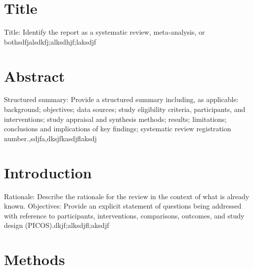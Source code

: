 \documentclass{article}\usepackage[]{graphicx}\usepackage[]{color}
\begin{document}
\section{Title}


Title: Identify the report as a systematic review, meta-analysis, or bothsdfjalsdkfj;alksdhjf;laksdjf

\section{Abstract}

Structured summary: Provide a structured summary including, as applicable: background; objectives; data sources; study eligibility criteria, participants, and interventions; study appraisal and synthesis methods; results; limitations; conclusions and implications of key findings; systematic review registration number.,sdjfa,dksjfkasdjflaksdj

\section{Introduction}

Rationale: Describe the rationale for the review in the context of what is already known. Objectives: Provide an explicit statement of questions being addressed with reference to participants, interventions, comparisons, outcomes, and study design (PICOS).dkjf;alksdjfl;aksdjf

\section{Methods}
\end{document}
